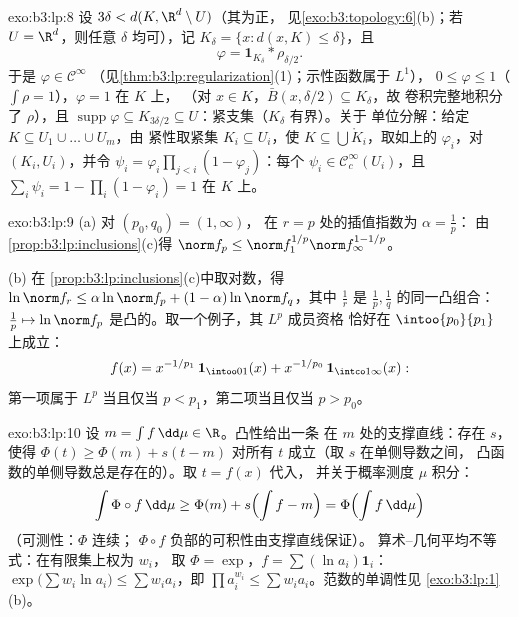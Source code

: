\begin{solution}{exo:b3:lp:8}
设 $3\delta < d(K, \R^d\setminus U)$（其为正，
见\cref{exo:b3:topology:6}(b)；若 $U = \R^d$，则任意 $\delta$
均可），记 $K_\delta = \{x : d(x, K) \leq \delta\}$，且
\[
\varphi = \mathbf 1_{K_\delta} * \rho_{\delta/2} .
\]
于是 $\varphi \in \mathcal C^\infty$
（见\cref{thm:b3:lp:regularization}(1)；示性函数属于 $L^1$），
$0 \leq \varphi \leq 1$（$\int\rho = 1$），$\varphi = 1$ 在 $K$ 上，
（对 $x \in K$，$\bar B(x, \delta/2) \subseteq K_\delta$，故
卷积完整地积分了 $\rho$），且
$\operatorname{supp}\varphi \subseteq K_{3\delta/2} \subseteq
U$：紧支集（$K_\delta$ 有界）。关于
单位分解：给定 $K \subseteq U_1\cup\dots\cup U_m$，由
紧性取紧集 $K_i \subseteq U_i$，使 $K \subseteq
\bigcup \mathring K_i$，取如上的 $\varphi_i$，对 $(K_i,
U_i)$，并令 $\psi_i = \varphi_i\prod_{j <i}(1 -
\varphi_j)$：每个 $\psi_i \in \mathcal C_c^\infty(U_i)$，且
$\sum_i\psi_i = 1 - \prod_i(1 - \varphi_i) = 1$ 在 $K$ 上。
\end{solution}

\begin{solution}{exo:b3:lp:9}
(a) 对 $(p_0, q_0) = (1, \infty)$，
在 $r = p$ 处的插值指数为 $\alpha = \frac1p$：
由\cref{prop:b3:lp:inclusions}(c)得 $\norm f_p \leq \norm
f_1^{1/p}\norm f_\infty^{1 - 1/p}$。

(b) 在
\cref{prop:b3:lp:inclusions}(c)中取对数，得 $\ln\norm f_r \leq
\alpha\ln\norm f_p + (1-\alpha)\ln\norm f_q$，其中 $\frac1r$
是 $\frac1p, \frac1q$ 的同一凸组合：$\frac1p
\mapsto \ln\norm f_p$ 是凸的。取一个例子，其 $L^p$ 成员资格
恰好在 $\intoo{p_0}{p_1}$ 上成立：
\[
f(x) = x^{-1/p_1}\,\mathbf 1_{\intoo01}(x) +
x^{-1/p_0}\,\mathbf 1_{\intco1\infty}(x):
\]
第一项属于 $L^p$ 当且仅当 $p < p_1$，第二项当且仅当 $p >
p_0$。
\end{solution}

\begin{solution}{exo:b3:lp:10}
设 $m = \int f\,\dd\mu \in \R$。凸性给出一条
在 $m$ 处的支撑直线：存在 $s$，使得 $\Phi(t) \geq \Phi(m) + s(t -
m)$ 对所有 $t$ 成立（取 $s$ 在单侧导数之间，
凸函数的单侧导数总是存在的）。取 $t = f(x)$ 代入，
并关于概率测度 $\mu$ 积分：
\[
\int\Phi\circ f\,\dd\mu \geq \Phi(m) + s\Bigl(\int f - m\Bigr)
= \Phi\Bigl(\int f\,\dd\mu\Bigr)
\]
（可测性：$\Phi$ 连续；
$\Phi\circ f$ 负部的可积性由支撑直线保证）。
算术–几何平均不等式：在有限集上权为 $w_i$，
取 $\Phi = \exp$，$f = \sum(\ln a_i)\mathbf 1_i$：
$\exp\bigl(\sum w_i\ln a_i\bigr) \leq \sum w_ia_i$，即
$\prod a_i^{w_i} \leq \sum w_ia_i$。范数的单调性见
\cref{exo:b3:lp:1}(b)。
\end{solution}

